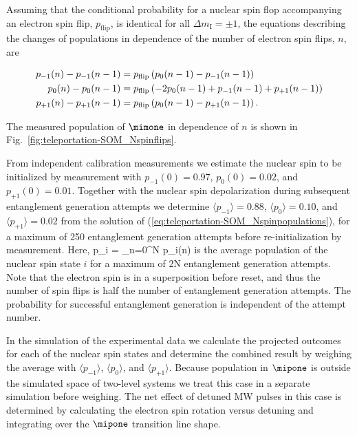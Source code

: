 Assuming that the conditional probability for a nuclear spin flop accompanying an electron spin flip, $p_\text{flip}$, is identical for all $\Delta m_\mathrm I = \pm 1$, the equations describing the changes of populations in dependence of the number of electron spin flips, $n$, are
\begin{widetext}
\begin{align}
   \label{eq:teleportation-SOM_Nspinpopulations}
   p_{-1}(n) - p_{-1}(n-1) &= p_\text{flip} 
       \left( p_{0}(n-1) - p_{-1}(n-1) \right) \notag\\
   p_{0}(n) - p_{0}(n-1) &= p_\text{flip}
       \left( -2 p_{0}(n-1) + p_{-1}(n-1) + p_{+1}(n-1) \right) \notag \\
   p_{+1}(n) - p_{+1}(n-1) &= p_\text{flip}
       \left( p_0(n-1) - p_{+1} (n-1) \right).
\end{align}
\end{widetext}
The measured population of $\mimone$ in dependence of $n$ is shown in Fig.~\ref{fig:teleportation-SOM_Nspinflips}.

From independent calibration measurements we estimate the nuclear spin to be initialized by measurement with $p_{-1}(0) = 0.97$, $p_{0}(0) = 0.02$, and $p_{+1}(0) = 0.01$. Together with the nuclear spin depolarization during subsequent entanglement generation attempts we determine $\langle p_{-1} \rangle = 0.88$, $\langle p_{0} \rangle = 0.10$, and $\langle p_{+1} \rangle = 0.02$ from the solution of (\ref{eq:teleportation-SOM_Nspinpopulations}), for a maximum of 250 entanglement generation attempts before re-initialization by measurement. Here,
\be
    \langle p_{i} \rangle =  \sum_{n=0}^{N} p_{i}(n)
\ee
is the average population of the nuclear spin state $i$ for a maximum of 2N entanglement generation attempts. Note that the electron spin is in a superposition before reset, and thus the number of spin flips is half the number of entanglement generation attempts. The probability for successful entanglement generation is independent of the attempt number.

In the simulation of the experimental data we calculate the projected outcomes for each of the nuclear spin states and determine the combined result by weighing the average with $\langle p_{-1} \rangle$, $\langle p_{0} \rangle$, and $\langle p_{+1} \rangle$. Because population in $\mipone$ is outside the simulated space of two-level systems we treat this case in a separate simulation before weighing. The net effect of detuned MW pulses in this case is determined by calculating the electron spin rotation versus detuning and integrating over the $\mipone$ transition line shape.

